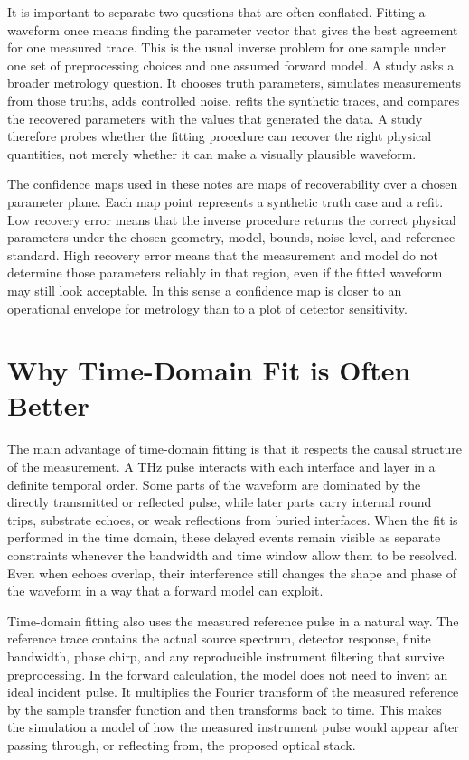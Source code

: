 \documentclass[11pt]{article}
\begin{document}
It is important to separate two questions that are often conflated. Fitting a waveform once means finding the parameter vector that gives the best agreement for one measured trace. This is the usual inverse problem for one sample under one set of preprocessing choices and one assumed forward model. A study asks a broader metrology question. It chooses truth parameters, simulates measurements from those truths, adds controlled noise, refits the synthetic traces, and compares the recovered parameters with the values that generated the data. A study therefore probes whether the fitting procedure can recover the right physical quantities, not merely whether it can make a visually plausible waveform.

The confidence maps used in these notes are maps of recoverability over a chosen parameter plane. Each map point represents a synthetic truth case and a refit. Low recovery error means that the inverse procedure returns the correct physical parameters under the chosen geometry, model, bounds, noise level, and reference standard. High recovery error means that the measurement and model do not determine those parameters reliably in that region, even if the fitted waveform may still look acceptable. In this sense a confidence map is closer to an operational envelope for metrology than to a plot of detector sensitivity.

\section{Why Time-Domain Fit is Often Better}

The main advantage of time-domain fitting is that it respects the causal structure of the measurement. A THz pulse interacts with each interface and layer in a definite temporal order. Some parts of the waveform are dominated by the directly transmitted or reflected pulse, while later parts carry internal round trips, substrate echoes, or weak reflections from buried interfaces. When the fit is performed in the time domain, these delayed events remain visible as separate constraints whenever the bandwidth and time window allow them to be resolved. Even when echoes overlap, their interference still changes the shape and phase of the waveform in a way that a forward model can exploit.

Time-domain fitting also uses the measured reference pulse in a natural way. The reference trace contains the actual source spectrum, detector response, finite bandwidth, phase chirp, and any reproducible instrument filtering that survive preprocessing. In the forward calculation, the model does not need to invent an ideal incident pulse. It multiplies the Fourier transform of the measured reference by the sample transfer function and then transforms back to time. This makes the simulation a model of how the measured instrument pulse would appear after passing through, or reflecting from, the proposed optical stack.
\end{document}

